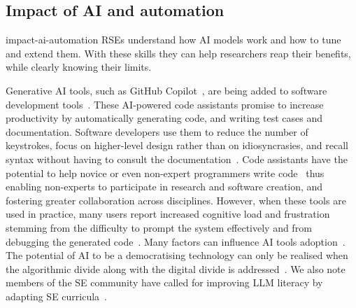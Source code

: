 \documentclass{eceasst}
\begin{document}
\subsection{Impact of AI and automation}
\label{sec:ai}
\begin{whatis}{}{impact-ai-automation}
RSEs understand how AI models work and how to tune and extend them.
With these skills they can help researchers reap their benefits,
while clearly knowing their limits.
\end{whatis}
Generative AI tools, such as GitHub Copilot~\cite{Friedmann2021},
are being added to software development tools~\cite{Alenezi2025}.
These AI-powered code assistants promise to increase productivity
by automatically generating code, and writing test cases and documentation.
Software developers use them to reduce the number of keystrokes,
focus on higher-level design rather than on idiosyncrasies,
and recall syntax without having to consult the documentation~\cite{Liang2024}.
Code assistants have the potential to help novice or even non-expert programmers
write code~\cite{Feldman2024} thus enabling non-experts to participate in research
and software creation, and fostering greater collaboration across disciplines.
However, when these tools are used in practice, many users report increased cognitive
load and frustration stemming from the difficulty to prompt the system effectively
and from debugging the generated code~\cite{Simkute2025}.
Many factors can influence AI tools adoption~\cite{Russo2024}.
The potential of AI to be a democratising technology can only be realised
when the algorithmic divide along with the digital divide is addressed~\cite{Yu2020}.
We also note members of the SE community have called for improving LLM literacy
by adapting SE curricula~\cite{Kirova2024}.
\end{document}
